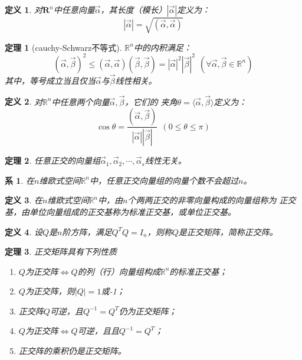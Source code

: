 \documentclass[a4paper]{book}
\newtheorem{Def}{定义}[chapter]
\newtheorem{cor}{系}[chapter]
\newtheorem{thm}{定理}[chapter]
\begin{document}
\begin{Def}
对$\mathbf{R}^n$中任意向量$\vec{\alpha}$，其长度（模长）$|\vec{\alpha}|$定义为：
\begin{equation*}
|\vec{\alpha}|=\sqrt{(\vec{\alpha},\vec{\alpha})}
\end{equation*}
\end{Def}

\begin{thm}
[cauchy-Schwarz不等式]$\mathbb{R}^n$中的内积满足：
\begin{equation*}
(\vec{\alpha},\vec{\beta})^2\leq(\vec{\alpha},\vec{\alpha})
(\vec{\beta},\vec{\beta})=|\vec{\alpha}|^2|\vec{\beta}|^2~~
(\forall\vec{\alpha},\vec{\beta}\in\mathbb{R}^n)
\end{equation*}
其中，等号成立当且仅当$\vec{\alpha}$与$\vec{\beta}$线性相关。
\end{thm}

\begin{Def}
对$\mathbb{R}^n$中任意两个向量$\vec{\alpha},\vec{\beta}$，它们的
夹角$\theta=\langle\vec{\alpha},\vec{\beta}\rangle$定义为：
\begin{equation*}
\cos\theta=\frac{(\vec{\alpha},\vec{\beta})}{|\vec\alpha||\vec\beta|}~~
(0\leq\theta\leq\pi)
\end{equation*}
\end{Def}

\begin{thm}
任意正交的向量组$\vec{\alpha}_1,\vec{\alpha}_2,\cdots,\vec{\alpha}_s$线性无关。
\end{thm}

\begin{cor}
在$n$维欧式空间$\mathbb{R}^n$中，任意正交向量组的向量个数不会超过$n$。
\end{cor}

\begin{Def}
在$n$维欧式空间$\mathbb{R}^n$中，由$n$个两两正交的非零向量构成的向量组称为
正交基，由单位向量组成的正交基称为标准正交基，或单位正交基。
\end{Def}

\begin{Def}
设$Q$是$n$阶方阵，满足$Q^TQ=I_n$，则称$Q$是正交矩阵，简称正交阵。
\end{Def}

\begin{thm}
正交矩阵具有下列性质
\begin{enumerate}
  \item $Q$为正交阵$\Leftrightarrow$$Q$的列（行）向量组构成$\mathbb{R}^n$的标准正交基；
  \item $Q$为正交阵，则$|Q|=1$或-1；
  \item 正交阵$Q$可逆，且$Q^{-1}=Q^{T}$仍为正交矩阵；
  \item $Q$为正交阵$\Leftrightarrow$$Q$可逆，且且$Q^{-1}=Q^{T}$；
  \item 正交阵的乘积仍是正交矩阵。
\end{enumerate}
\end{thm}
\end{document}
